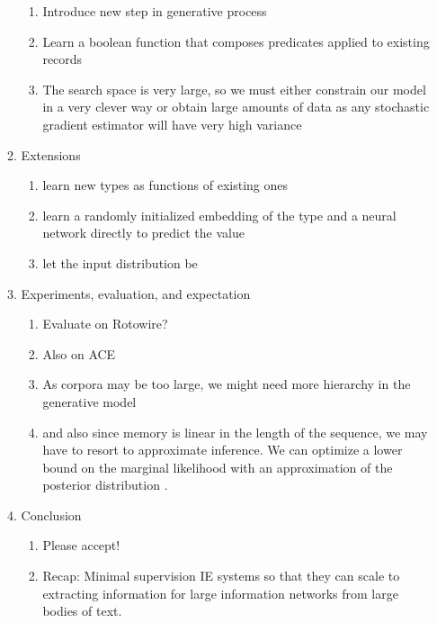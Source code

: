 \documentclass[11pt]{article}
\begin{document}
\begin{enumerate}
\begin{enumerate}
\begin{enumerate}
        \item Introduce new step in generative process
        \item Learn a boolean function that composes predicates applied to existing
            records
        \item The search space is very large, so we must either constrain our model 
            in a very clever way or obtain 
            large amounts of data as any stochastic gradient estimator will have very high variance
        \end{enumerate}
    \item Extensions
        \begin{enumerate}
        \item learn new types as functions of existing ones
        \item learn a randomly initialized embedding of the type
            and a neural network directly to predict the value
        \item let the input distribution be 
        \end{enumerate}
    \item Experiments, evaluation, and expectation
        \begin{enumerate}
        \item Evaluate on Rotowire?
        \item Also on ACE
        \item As corpora may be too large, we might need more hierarchy in the generative model
        \item and also since memory is linear in the length of the sequence, we may have
            to resort to approximate inference. We can optimize a lower bound
            on the marginal likelihood with an approximation of the
            posterior distribution \citep{deng2018attn}.
        \end{enumerate}
    \item Conclusion
        \begin{enumerate}
        \item Please accept!
        \item Recap: Minimal supervision IE systems so that they can scale to
            extracting information for large information networks from large bodies of text.
        \end{enumerate}
    \end{enumerate}
\end{enumerate}



\end{document}

